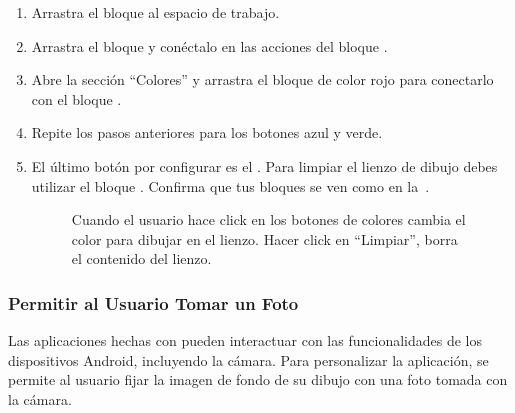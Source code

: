 \begin{enumerate}
\item Arrastra el bloque  al espacio de
  trabajo.

\item Arrastra el bloque  y
  conéctalo en las acciones del bloque .

\item Abre la sección ``Colores'' y arrastra el bloque de color rojo
  para conectarlo con el bloque .

\item Repite los pasos anteriores para los botones azul y verde.

\item El último botón por configurar es el
  . Para limpiar el lienzo de dibujo debes
  utilizar el bloque . Confirma que tus
  bloques se ven como en la~.

\begin{figure}[H]
\centering
\caption{Cuando el usuario hace click en los botones de colores cambia
el color para dibujar en el lienzo. Hacer click en ``Limpiar'', borra
el contenido del lienzo.}
\label{fig:PaintPot13}
\end{figure}

\end{enumerate}

\subsubsection*{Permitir al Usuario Tomar un Foto}

Las aplicaciones hechas con \AppInventor pueden interactuar con las
funcionalidades de los dispositivos Android, incluyendo la
cámara. Para personalizar la aplicación, se permite al usuario fijar
la imagen de fondo de su dibujo con una foto tomada con la cámara.

